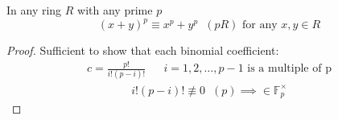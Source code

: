 \documentclass[11pt]{article}
\begin{document}
\begin{lemma}
In any ring $R$ with any prime $p$
	\begin{equation*}
		(x+y)^p \equiv x^p +y^p\hspace{7pt} (pR) \text{ for any } x,y \in R 
	\end{equation*}
\end{lemma}
\begin{proof}
Sufficient to show that each binomial coefficient:
	\begin{align*}
		c=\frac{p!}{i!(p-i)!} && i =1,2,\dots,p-1 \text{ is a multiple of p}
	\end{align*}
	\begin{align*}
		i!(p-i)! \not \equiv 0 \hspace{7pt} (p) \implies  \in \mathbb{F}^\times_p
	\end{align*}
\end{proof}
\end{document}
